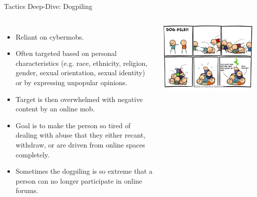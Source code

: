 \documentclass[nobackground,dvipsnames,table]{beamer}
\begin{document}
\begin{frame}{Tactics Deep-Dive: Dogpiling}
    \begin{columns}[T]
            \scriptsize
            \begin{itemize}
                \item Reliant on cybermobs.
                \item Often targeted based on personal characteristics (e.g. race, ethnicity, religion, gender, sexual orientation, sexual identity) or by expressing unpopular opinions.
                \item Target is then overwhelmed with negative content by an online mob.
                \item Goal is to make the person so tired of dealing with abuse that they either recant, withdraw, or are driven from online spaces completely.
                \item Sometimes the dogpiling is so extreme that a person can no longer participate in online forums.
            \end{itemize}
            \includegraphics[width=\textwidth]{dogpile-cyanide-and-happiness}
    \end{columns}
\end{frame}
\end{document}
